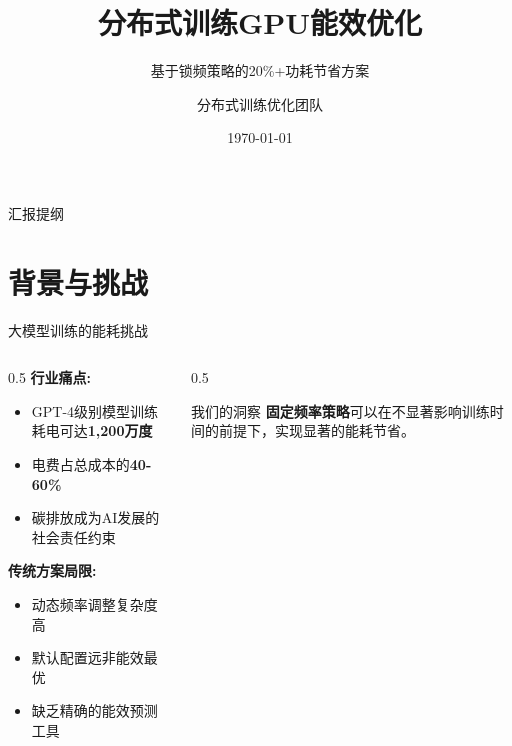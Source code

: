 \documentclass[aspectratio=169,10pt]{beamer}
\title[GPU能效优化]{\textbf{分布式训练GPU能效优化}}
\subtitle{基于锁频策略的20\%+功耗节省方案}
\author[团队]{分布式训练优化团队}
\institute[]{ Megatron-DeepSpeed 能效实验项目 }
\date{\today}
\begin{document}
{
\begin{frame}
\titlepage
\end{frame}
}

\begin{frame}{汇报提纲}
\tableofcontents
\end{frame}

\section{背景与挑战}

\begin{frame}{大模型训练的能耗挑战}
\begin{columns}
\begin{column}{0.5\textwidth}
\textbf{行业痛点:}
\begin{itemize}
    \item GPT-4级别模型训练耗电可达\textbf{1,200万度}
    \item 电费占总成本的\textbf{40-60\%}
    \item 碳排放成为AI发展的社会责任约束
\end{itemize}
\vspace{0.5cm}
\textbf{传统方案局限:}
\begin{itemize}
    \item 动态频率调整复杂度高
    \item 默认配置远非能效最优
    \item 缺乏精确的能效预测工具
\end{itemize}
\end{column}
\begin{column}{0.5\textwidth}
\begin{block}{我们的洞察}
\textbf{固定频率策略}可以在不显著影响训练时间的前提下，实现显著的能耗节省。
\end{block}
\vspace{0.3cm}
\end{column}
\end{columns}
\end{frame}
\end{document}
